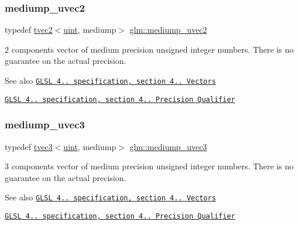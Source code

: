 \subsubsection{\texorpdfstring{mediump\+\_\+uvec2}{mediump\_uvec2}}
{\footnotesize\ttfamily typedef \hyperlink{structglm_1_1tvec2}{tvec2}$<$\hyperlink{group__core__precision_ga4fd29415871152bfb5abd588334147c8}{uint}, mediump$>$ \hyperlink{group__core__precision_ga7ec96113b08a8435fd80dd623ffe3e05}{glm\+::mediump\+\_\+uvec2}}

2 components vector of medium precision unsigned integer numbers. There is no guarantee on the actual precision.

\begin{DoxySeeAlso}{See also}
\href{http://www.opengl.org/registry/doc/GLSLangSpec.4.20.8.pdf}{\tt G\+L\+SL 4.. specification, section 4.. Vectors} 

\href{http://www.opengl.org/registry/doc/GLSLangSpec.4.20.8.pdf}{\tt G\+L\+SL 4.. specification, section 4.. Precision Qualifier} 
\end{DoxySeeAlso}
\mbox{\label{group__core__precision_ga628d87a2d3b8e287d569c6eb12d8e051}} 
\subsubsection{\texorpdfstring{mediump\+\_\+uvec3}{mediump\_uvec3}}
{\footnotesize\ttfamily typedef \hyperlink{structglm_1_1tvec3}{tvec3}$<$\hyperlink{group__core__precision_ga4fd29415871152bfb5abd588334147c8}{uint}, mediump$>$ \hyperlink{group__core__precision_ga628d87a2d3b8e287d569c6eb12d8e051}{glm\+::mediump\+\_\+uvec3}}

3 components vector of medium precision unsigned integer numbers. There is no guarantee on the actual precision.

\begin{DoxySeeAlso}{See also}
\href{http://www.opengl.org/registry/doc/GLSLangSpec.4.20.8.pdf}{\tt G\+L\+SL 4.. specification, section 4.. Vectors} 

\href{http://www.opengl.org/registry/doc/GLSLangSpec.4.20.8.pdf}{\tt G\+L\+SL 4.. specification, section 4.. Precision Qualifier} 
\end{DoxySeeAlso}
\mbox{\label{group__core__precision_ga825e1e6ef3513c5de283d1b2fa1d4879}} 
